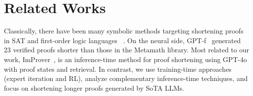 
\section{Related Works}

Classically, there have been many symbolic methods targeting shortening proofs in SAT and first-order logic languages ~\citep{rahul2001proof, vyskovcil2010automated, wernhard2024investigations, gladshtein2024small,kinyon-proof-simp}. On the neural side, GPT-f~\citep{polu2020generative} generated 23 verified proofs shorter than those in the Metamath library. Most related to our work, ImProver~\citep{ahuja2024improver}, is an inference-time method for proof shortening using GPT-4o with proof states and retrieval. In contrast, we use training-time approaches (expert iteration and RL), analyze complementary inference-time techniques, and focus on shortening longer proofs generated by SoTA LLMs.